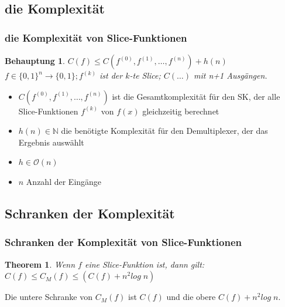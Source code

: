 \documentclass[hyperref={pdfpagelabels=false}]{beamer} %
\newtheorem{thm}{Theorem}
\newtheorem{beh}{Behauptung}
\begin{document}

  \subsection{die Komplexität}
  \begin{frame}%
    \frametitle{die Komplexität von Slice-Funktionen}
    \begin{beh}
      $C(f) \leq C(f^{(0)}, f^{(1)}, \dots ,f^{(n)})+h(n)$\\
      $f \in \{0,1\}^{n} \rightarrow \{0,1\} ; f^{(k)}$ ist der $k$-te Slice; $C(\dots)$ mit n+1 Ausg\"angen.
    \end{beh}
    \begin{itemize}
      \item $C(f^{(0)}, f^{(1)}, \dots ,f^{(n)})$ ist die Gesamtkomplexität für den SK, der alle Slice-Funktionen $f^{(k)}$ von $f(x)$ gleichzeitig berechnet
      \item $h(n) \in \mathbb{N}$ die benötigte Komplexität für den Demultiplexer, der das Ergebnis ausw\"ahlt
      \item $h \in \mathcal{O}(n)$
      \item $n$ Anzahl der Eingänge
    \end{itemize}
  \end{frame}

  \subsection*{Schranken der Komplexität}
  \begin{frame}%
    \frametitle{Schranken der Komplexität von Slice-Funktionen}
    \begin{thm}
      Wenn $f$ eine Slice-Funktion ist, dann gilt:
      $C(f) \leq C_M(f) \leq (C(f) + n^2 log\;n)$%
    \end{thm}
    Die untere Schranke von $C_M(f)$ ist $C(f)$ und die obere $C(f) + n^2 log\;n$.
  \end{frame}
\end{document}
